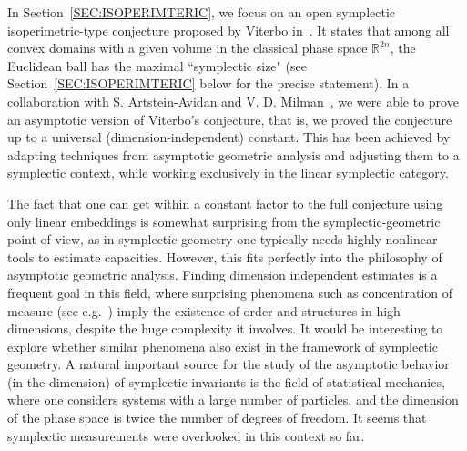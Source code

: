 \documentclass{icmart}
\theoremstyle{definition}
\begin{document}
\smallskip

In Section~\ref{SEC:ISOPERIMTERIC}, we focus on an open symplectic isoperimetric-type conjecture proposed  by Viterbo in~\cite{V}. It states that among all convex domains 
 with a given volume in the classical phase space ${\mathbb R}^{2n}$, the Euclidean ball has the maximal ``symplectic size" (see Section~\ref{SEC:ISOPERIMTERIC} below for the precise statement). 
In a collaboration with S. Artstein-Avidan and V. D.  Milman~\cite{AMO},   
we were able to prove an asymptotic version of Viterbo's conjecture, that is, we proved the conjecture up to a universal (dimension-independent) constant. This has been achieved by  adapting %
techniques from asymptotic geometric analysis and adjusting them
to a symplectic context, while working exclusively in the linear symplectic category.

\smallskip

The fact that one can get within a constant factor to the full conjecture using only linear embeddings is somewhat surprising from the symplectic-geometric point of view, as in symplectic geometry one typically 
needs highly nonlinear tools to estimate capacities.
However, this  fits perfectly into the philosophy of asymptotic geometric analysis.
Finding dimension independent estimates is a
frequent goal in this field, 
where surprising phenomena such
as concentration of measure (see e.g.~\cite{MilSch}) imply the existence of order and structures
in high dimensions, despite the huge complexity it involves. 
It would be interesting to explore whether similar phenomena also exist in the framework of symplectic geometry.
A natural important source for the study of the asymptotic  behavior (in the dimension) of symplectic invariants is the field of statistical mechanics,  
where one considers systems with a large number of particles, and the dimension of the phase space is twice the number of degrees of freedom. 
It seems that symplectic measurements were overlooked in this context so far. 
\end{document}
